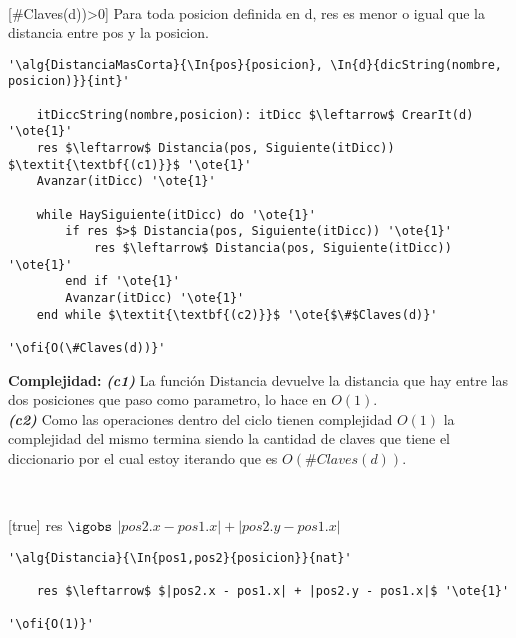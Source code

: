 ~


[\#Claves(d))>0]
{Para toda posicion definida en d, res es menor o igual que la distancia entre pos y la posicion.}



\begin{lstlisting}[mathescape]
'\alg{DistanciaMasCorta}{\In{pos}{posicion}, \In{d}{dicString(nombre, posicion)}}{int}'

	itDiccString(nombre,posicion): itDicc $\leftarrow$ CrearIt(d) '\ote{1}'
	res $\leftarrow$ Distancia(pos, Siguiente(itDicc)) $\textit{\textbf{(c1)}}$ '\ote{1}'
	Avanzar(itDicc) '\ote{1}'

	while HaySiguiente(itDicc) do '\ote{1}'
		if res $>$ Distancia(pos, Siguiente(itDicc)) '\ote{1}'
			res $\leftarrow$ Distancia(pos, Siguiente(itDicc)) '\ote{1}'
		end if '\ote{1}'
		Avanzar(itDicc) '\ote{1}'
	end while $\textit{\textbf{(c2)}}$ '\ote{$\#$Claves(d)}'

'\ofi{O(\#Claves(d))}'
\end{lstlisting}

\textbf{Complejidad:}  \textit{\textbf{(c1)}} La función Distancia devuelve la distancia que hay entre las dos posiciones que paso como parametro, lo hace en $O(1)$. \\
\textit{\textbf{(c2)}} Como las operaciones dentro del ciclo tienen complejidad $O(1)$ la complejidad del mismo termina siendo la cantidad de claves que tiene el diccionario por el cual estoy iterando que es $O(\#Claves(d))$.

~

[true]
{res $\igobs$ $|pos2.x - pos1.x| + |pos2.y - pos1.x|$}


\begin{lstlisting}[mathescape]
'\alg{Distancia}{\In{pos1,pos2}{posicion}}{nat}'

	res $\leftarrow$ $|pos2.x - pos1.x| + |pos2.y - pos1.x|$ '\ote{1}'

'\ofi{O(1)}'
\end{lstlisting}

~

